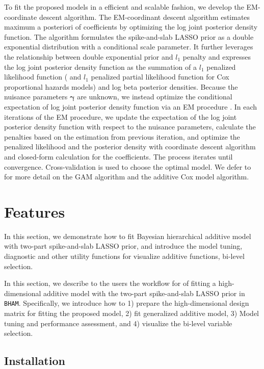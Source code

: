 \documentclass[
]{jss}
\begin{document}
To fit the proposed models in a efficient and scalable fashion, we
develop the EM-coordinate descent algorithm. The EM-coordinant descent
algorithm estimates maximum a posteriori of coefficients by optimizing
the log joint posterior density function. The algorithm formulates the
spike-and-slab LASSO prior as a double exponential distribution with a
conditional scale parameter. It further leverages the relationship
between double exponential prior and \(l_1\) penalty and expresses the
log joint posterior density function as the summation of a \(l_1\)
penalized likelihood function ( and \(l_1\) penalized partial likelihood
function for Cox proportional hazards models) and log beta posterior
densities. Because the nuisance parameters \(\boldsymbol{\gamma}\) are
unknown, we instead optimize the conditional expectation of log joint
posterior density function via an EM procedure \citep{dempster1977}. In
each iterations of the EM procedure, we update the expectation of the
log joint posterior density function with respect to the nuisance
parameters, calculate the penalties based on the estimation from
previous iteration, and optimize the penalized likelihood and the
posterior density with coordinate descent algorithm and closed-form
calculation for the coefficients. The process iterates until
convergence. Cross-validation is used to choose the optimal model. We
defer to \cite{guo2022_GAM, guo2022_Cox} for more detail on the GAM
algorithm and the additive Cox model algorithm.

\section{Features}

In this section, we demonstrate how to fit Bayesian hierarchical
additive model with two-part spike-and-slab LASSO prior, and introduce
the model tuning, diagnostic and other utility functions for visualize
additive functions, bi-level selection.

In this section, we describe to the users the workflow for of fitting a
high-dimensional additive model with the two-part spike-and-slab LASSO
prior in \texttt{BHAM}. Specifically, we introduce how to 1) prepare the
high-dimensional design matrix for fitting the proposed model, 2) fit
generalized additive model, 3) Model tuning and performance assessment,
and 4) visualize the bi-level variable selection.

\subsection{Installation}
\end{document}
